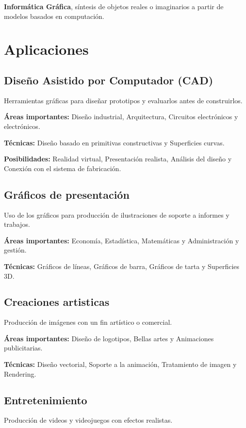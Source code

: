 \textbf{Informática Gráfica}, síntesis de objetos reales o imaginarios a partir de modelos basados en computación.

\section{Aplicaciones}\label{sec:aplicaciones}

\subsection{Diseño Asistido por Computador (CAD)}\label{subsec:diseño-asistido-por-computador-(cad)}
Herramientas gráficas para diseñar prototipos y evaluarlos antes de construirlos.

\textbf{Áreas importantes:} Diseño industrial, Arquitectura, Circuitos electrónicos y electrónicos.

\textbf{Técnicas:} Diseño basado en primitivas constructivas y Superficies curvas.

\textbf{Posibilidades:} Realidad virtual, Presentación realista, Análisis del diseño y Conexión con el sistema de fabricación.

\subsection{Gráficos de presentación}\label{subsec:gráficos-de-presentación}
Uso de los gráficos para producción de ilustraciones de soporte a informes y trabajos.

\textbf{Áreas importantes:} Economía, Estadística, Matemáticas y Administración y gestión.

\textbf{Técnicas:} Gráficos de líneas, Gráficos de barra, Gráficos de tarta y Superficies 3D\@.

\subsection{Creaciones artisticas}\label{subsec:creaciones-artisticas}
Producción de imágenes con un fin artístico o comercial.

\textbf{Áreas importantes:} Diseño de logotipos, Bellas artes y Animaciones publicitarias.

\textbf{Técnicas:} Diseño vectorial, Soporte a la animación, Tratamiento de imagen y Rendering.

\subsection{Entretenimiento}\label{subsec:entretenimiento}
Producción de videos y videojuegos con efectos realistas.

